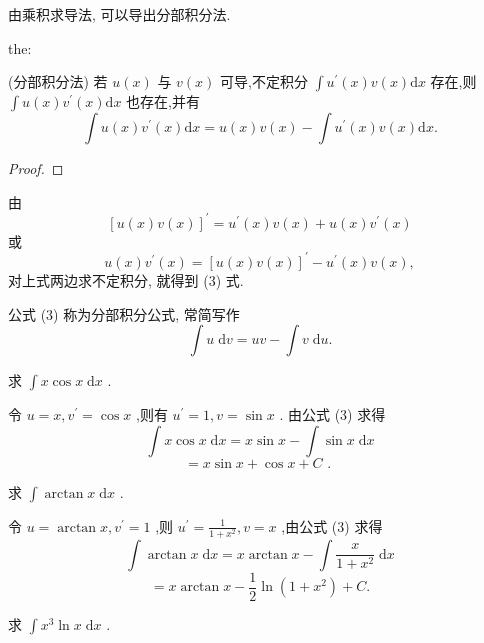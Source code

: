 由乘积求导法, 可以导出分部积分法.

\begin{theorem}{}{the:}

\end{theorem}
 (分部积分法) 若 \(u\left( x\right)\) 与 \(v\left( x\right)\) 可导,不定积分 \(\int {u}^{\prime }\left( x\right) v\left( x\right) \mathrm{d}x\) 存在,则 \(\int u\left( x\right) {v}^{\prime }\left( x\right) \mathrm{d}x\) 也存在,并有
\[
\int u\left( x\right) {v}^{\prime }\left( x\right) \mathrm{d}x = u\left( x\right) v\left( x\right)  - \int {u}^{\prime }\left( x\right) v\left( x\right) \mathrm{d}x. \tag{3}
\]
\begin{proof}

\end{proof}
由
\[
{\left\lbrack  u\left( x\right) v\left( x\right) \right\rbrack  }^{\prime } = {u}^{\prime }\left( x\right) v\left( x\right)  + u\left( x\right) {v}^{\prime }\left( x\right)
\]
或
\[
u\left( x\right) {v}^{\prime }\left( x\right)  = {\left\lbrack  u\left( x\right) v\left( x\right) \right\rbrack  }^{\prime } - {u}^{\prime }\left( x\right) v\left( x\right) ,
\]
对上式两边求不定积分, 就得到 (3) 式.

公式 (3) 称为分部积分公式, 常简写作
\[
\int u\mathrm{\;d}v = {uv} - \int v\mathrm{\;d}u. \tag{4}
\]
\begin{example}

\end{example}
求 \(\int x\cos x\mathrm{\;d}x\) .

\begin{solution}

\end{solution}
令 \(u = x,{v}^{\prime } = \cos x\) ,则有 \({u}^{\prime } = 1,v = \sin x\) . 由公式 (3) 求得
\[
\int x\cos x\mathrm{\;d}x = x\sin x - \int \sin x\mathrm{\;d}x
\]
\[
= x\sin x + \cos x + C\text{ . }
\]
\begin{example}

\end{example}
求 \(\int \arctan x\mathrm{\;d}x\) .

\begin{solution}

\end{solution}
令 \(u = \arctan x,{v}^{\prime } = 1\) ,则 \({u}^{\prime } = \frac{1}{1 + {x}^{2}},v = x\) ,由公式 (3) 求得
\[
\int \arctan x\mathrm{\;d}x = x\arctan x - \int \frac{x}{1 + {x}^{2}}\mathrm{\;d}x
\]
\[
= x\arctan x - \frac{1}{2}\ln \left( {1 + {x}^{2}}\right)  + C.
\]
\begin{example}

\end{example}
求 \(\int {x}^{3}\ln x\mathrm{\;d}x\) .

